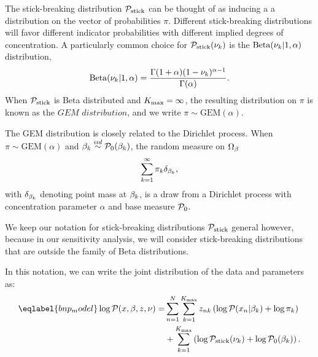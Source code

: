 The stick-breaking distribution $\mathcal{P}_{\mathrm{stick}}$ can be thought of as inducing a
a distribution on the vector of probabilities $\pi$. Different
stick-breaking distributions will favor different indicator probabilities
with different implied degrees of concentration.
A particularly common choice for
$\mathcal{P}_{\mathrm{stick}}(\nu_{k})$ is the $\mathrm{Beta}(\nu_{k} \vert 1, \alpha)$ distribution,
%
\begin{align*}
%
\mathrm{Beta}(\nuk \vert 1, \alpha) =
    \frac{\Gamma(1 + \alpha) (1 - \nuk)^{\alpha - 1}}
         {\Gamma(\alpha)}.
%
\end{align*}
%
When $\mathcal{P}_{\mathrm{stick}}$ is Beta distributed
and ${K_{\mathrm{max}}}=\infty$, the resulting distribution on $\pi$  is known as the
$\textit{GEM distribution}$, and we write $\pi \sim \mathrm{GEM}(\alpha)$.

The GEM distribution is closely related to the Dirichlet process.
When $\pi \sim \mathrm{GEM}(\alpha)$ and
$\beta_k \overset{iid}{\sim} \mathcal{P}_{0}(\beta_k)$,
the random measure on $\Omega_{\beta}$
\begin{align*}
  \sum_{k = 1}^\infty \pi_k\delta_{\beta_k},
\end{align*}
with $\delta_{\beta_k}$ denoting point mass at $\beta_k$,
is a draw from a Dirichlet process with concentration parameter $\alpha$
and base measure $\mathcal{P}_{0}$.

We keep our notation for stick-breaking distributions $\mathcal{P}_{\mathrm{stick}}$ general however,
because in our sensitivity analysis,
we will consider stick-breaking distributions that are outside the
family of Beta distributions.

In this notation, we can write the joint distribution of
the data and parameters as:
%
\begin{align}\eqlabel{bnp_model}
%
\logp(\x, \beta, \z, \nu) =&
\sum_{n=1}^N \sum_{k=1}^{\kmax}
    \z_{\n\k} \left(
        \logp(\x_n \vert \beta_\k) + \log \pi_\k
    \right)
\nonumber\\
   & +
    \sum_{k=1}^{\kmax} \left(
        \log \pstick(\nuk) + \log \pbeta(\beta_\k)
    \right).
%
\end{align}
%

